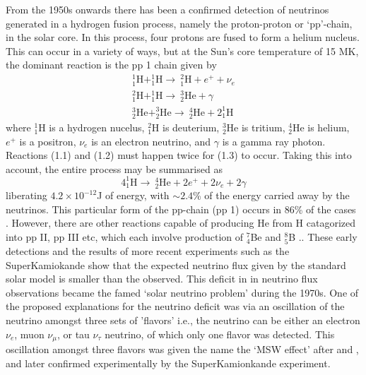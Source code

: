 From the 1950s onwards there has been a confirmed detection of neutrinos generated in a hydrogen fusion process, namely the proton-proton or \textquoteleft pp'-chain, in the solar core. In this process, four protons are fused to form a helium nucleus. This can occur in a variety of ways, but at the Sun's core temperature of 15 MK, the dominant reaction is the pp 1 chain given by
\begin{eqnarray}
^{1}_1\mathrm{H} + ^{1}_1\mathrm{H} \rightarrow ~^{2}_1\mathrm{H} + e^{+}  + \nu_e \\
%
^{2}_1\mathrm{H} + ^{1}_1\mathrm{H} \rightarrow ~^{3}_2\mathrm{He} + \gamma \\
%
^{3}_2\mathrm{He}+^{3}_2\mathrm{He} \rightarrow ~^{4}_2\mathrm{He} + 2^{1}_1\mathrm{H}
\end{eqnarray}
where $^{1}_1\mathrm{H}$ is a hydrogen nucelus, $^{2}_1\mathrm{H}$ is deuterium, $^{3}_2\mathrm{He}$ is tritium, $^{4}_2\mathrm{He}$ is helium, $e^{+}$ is a positron, $\nu_e$ is an electron neutrino, and $\gamma$ is a gamma ray photon. Reactions (1.1) and (1.2) must happen twice for (1.3) to occur. Taking this into account, the entire process may be summarised as 
\begin{equation}
4 ^{1}_1\mathrm{H}  \rightarrow ~^{4}_2\mathrm{He} + 2e^{+} + 2\nu_e + 2\gamma
\end{equation}
liberating $4.2\times10^{-12}$J of energy, with $\sim2.4$\% of the energy carried away by the neutrinos. This particular form of the pp-chain (pp 1) occurs in 86\% of the cases \citep{turk2011}. However, there are other reactions capable of producing He from H catagorized into pp II, pp III etc, which each involve production of $^7_4$Be and $^8_5$B \citep{davis1968}.. 
These early detections and the results of more recent experiments such as the SuperKamiokande \citep{fukuda1998} show that the expected neutrino flux given by the standard solar model is smaller than the observed. This deficit in in neutrino flux observations became the famed \textquoteleft solar neutrino problem' during the 1970s. 
One of the proposed explanations for the neutrino deficit was via an oscillation of the neutrino amongst three sets of 'flavors' i.e., the neutrino can be either an electron $\nu_e$, muon $\nu_{\mu}$, or tau $\nu_{\tau}$ neutrino, of which only one flavor was detected.
This oscillation amongst three flavors was given the name the \textquoteleft MSW effect' after \citet{mikheev1986} and \citet{wolfenstein1978}, and later confirmed experimentally by the SuperKamionkande experiment.

